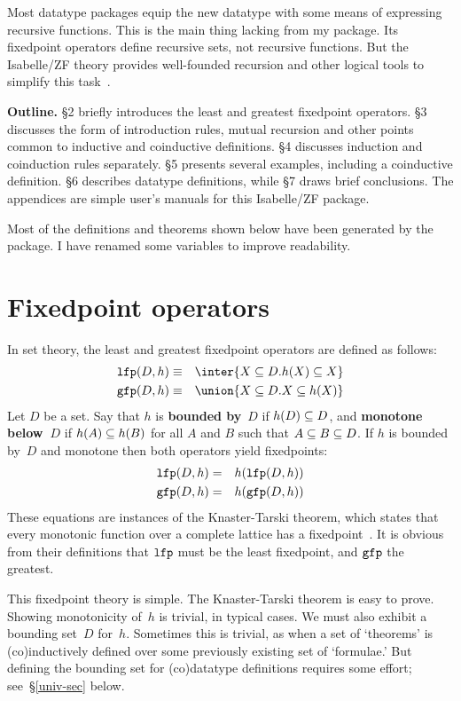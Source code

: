 Most datatype packages equip the new datatype with some means of expressing
recursive functions.  This is the main thing lacking from my package.  Its
fixedpoint operators define recursive sets, not recursive functions.  But
the Isabelle/ZF theory provides well-founded recursion and other logical
tools to simplify this task~\cite{paulson-set-II}.

{\bf Outline.}  \S2 briefly introduces the least and greatest fixedpoint
operators.  \S3 discusses the form of introduction rules, mutual recursion and
other points common to inductive and coinductive definitions.  \S4 discusses
induction and coinduction rules separately.  \S5 presents several examples,
including a coinductive definition.  \S6 describes datatype definitions, while
\S7 draws brief conclusions.  \ifCADE\else The appendices are simple user's
manuals for this Isabelle/ZF package.\fi

Most of the definitions and theorems shown below have been generated by the
package.  I have renamed some variables to improve readability.
 
\section{Fixedpoint operators}
In set theory, the least and greatest fixedpoint operators are defined as
follows:
\begin{eqnarray*}
   \lfp(D,h)  & \equiv & \inter\{X\sbs D. h(X)\sbs X\} \\
   \gfp(D,h)  & \equiv & \union\{X\sbs D. X\sbs h(X)\}
\end{eqnarray*}   
Let $D$ be a set.  Say that $h$ is {\bf bounded by}~$D$ if $h(D)\subseteq D$, and
{\bf monotone below~$D$} if
$h(A)\subseteq h(B)$ for all $A$ and $B$ such that $A\subseteq B\subseteq D$.  If $h$ is
bounded by~$D$ and monotone then both operators yield fixedpoints:
\begin{eqnarray*}
   {\tt lfp}(D,h)  & = & h({\tt lfp}(D,h)) \\
   {\tt gfp}(D,h)  & = & h({\tt gfp}(D,h)) 
\end{eqnarray*}   
These equations are instances of the Knaster-Tarski theorem, which states
that every monotonic function over a complete lattice has a
fixedpoint~\cite{davey&priestley}.  It is obvious from their definitions
that  ${\tt lfp}$ must be the least fixedpoint, and ${\tt gfp}$ the greatest.

This fixedpoint theory is simple.  The Knaster-Tarski theorem is easy to
prove.  Showing monotonicity of~$h$ is trivial, in typical cases.  We must
also exhibit a bounding set~$D$ for~$h$.  Sometimes this is trivial, as
when a set of `theorems' is (co)inductively defined over some previously
existing set of `formulae.'  But defining the bounding set for
(co)datatype definitions requires some effort; see~\S\ref{univ-sec} below.


